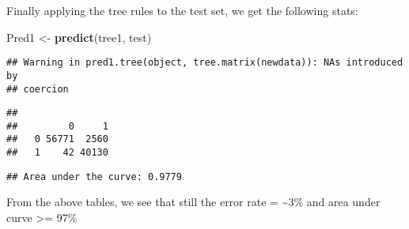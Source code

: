 \documentclass[]{article}
\newenvironment{Shaded}{\begin{snugshade}}{\end{snugshade}}
\newcommand{\KeywordTok}[1]{\textcolor[rgb]{0.13,0.29,0.53}{\textbf{#1}}}
\newcommand{\DataTypeTok}[1]{\textcolor[rgb]{0.13,0.29,0.53}{#1}}
\newcommand{\DecValTok}[1]{\textcolor[rgb]{0.00,0.00,0.81}{#1}}
\newcommand{\FloatTok}[1]{\textcolor[rgb]{0.00,0.00,0.81}{#1}}
\newcommand{\StringTok}[1]{\textcolor[rgb]{0.31,0.60,0.02}{#1}}
\newcommand{\CommentTok}[1]{\textcolor[rgb]{0.56,0.35,0.01}{\textit{#1}}}
\newcommand{\OperatorTok}[1]{\textcolor[rgb]{0.81,0.36,0.00}{\textbf{#1}}}
\newcommand{\NormalTok}[1]{#1}
\begin{document}
Finally applying the tree rules to the test set, we get the following
stats:

\begin{Shaded}
\begin{Highlighting}[]
\NormalTok{Pred1 <-}\StringTok{ }\KeywordTok{predict}\NormalTok{(tree1, test)}
\end{Highlighting}
\end{Shaded}

\begin{verbatim}
## Warning in pred1.tree(object, tree.matrix(newdata)): NAs introduced by
## coercion
\end{verbatim}

\begin{Shaded}
\end{Shaded}

\begin{verbatim}
##    
##         0     1
##   0 56771  2560
##   1    42 40130
\end{verbatim}

\begin{Shaded}
\end{Shaded}

\begin{verbatim}
## Area under the curve: 0.9779
\end{verbatim}

From the above tables, we see that still the error rate =
\textasciitilde{}3\% and area under curve \textgreater{}= 97\%
\end{document}
